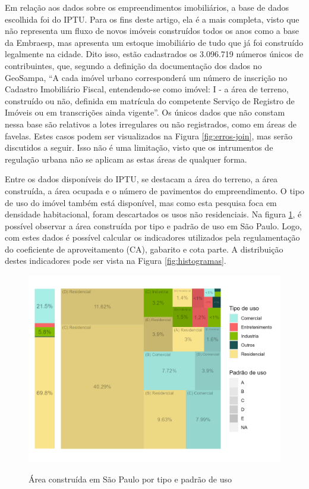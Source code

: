Em relação aos dados sobre os empreendimentos imobiliários, a base de dados escolhida foi do IPTU. Para os fins deste artigo, ela é a mais completa, visto que não representa um fluxo de novos imóveis construídos todos os anos como a base da Embraesp, mas apresenta um estoque imobiliário de tudo que já foi construído legalmente na cidade. Dito isso, estão cadastrados os 3.096.719 números únicos de contribuintes, que, segundo a definição da documentação dos dados no GeoSampa, ``A cada imóvel urbano corresponderá um número de inscrição no Cadastro Imobiliário Fiscal, entendendo-se como imóvel: I - a área de terreno, construído ou não, definida em matrícula do competente Serviço de Registro de Imóveis ou em transcrições ainda vigente''. Os únicos dados que não constam nessa base são relativos a lotes irregulares ou não registrados, como em áreas de favelas. Estes casos podem ser visualizados na Figura \ref{fig:erros-join}, mas serão discutidos a seguir. Isso não é uma limitação, visto que os intrumentos de regulação urbana não se aplicam as estas áreas de qualquer forma.

Entre os dados disponíveis do IPTU, se destacam a área do terreno, a área construída, a área ocupada e o número de pavimentos do empreendimento. O tipo de uso do imóvel também está disponível, mas como esta pesquisa foca em densidade habitacional, foram descartados os usos não residenciais. Na figura \ref{fig:area_construida}, é possível observar a área construída por tipo e padrão de uso em São Paulo. Logo, com estes dados é possível calcular os indicadores utilizados pela regulamentação do coeficiente de aproveitamento (CA), gabarito e cota parte. A distribuição destes indicadores pode ser vista na Figura \ref{fig:histogramas}.

\begin{figure}[h]
    \centering
    \caption{Área construída em São Paulo por tipo e padrão de uso}
    \includegraphics[width = .8\linewidth]{imagens/tree_area_construida.png}
    \label{fig:area_construida}
\end{figure}


